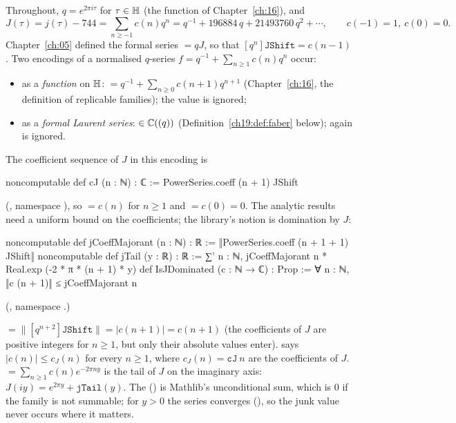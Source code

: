 Throughout, $q=e^{2\pi i\tau}$ for $\tau\in\mathbb{H}$ (the function  of Chapter~\ref{ch:16}), and
\begin{equation*}
  J(\tau)=j(\tau)-744=\sum_{n\ge-1}c(n)q^n=q^{-1}+196884\,q+21493760\,q^2+\cdots,\qquad c(-1)=1,\ c(0)=0 .
\end{equation*}
Chapter~\ref{ch:05} defined the formal series  $=qJ$, so that $[q^n]\mathtt{JShift}=c(n-1)$.  Two
encodings of a normalised $q$-series $f=q^{-1}+\sum_{n\ge1}c(n)q^n$ occur:
\begin{itemize}
\item as a \emph{function} on $\mathbb{H}$:  $=q^{-1}+\sum_{n\ge0}c(n+1)q^{n+1}$
  (Chapter~\ref{ch:16}, the definition of replicable families); the value  is ignored;
\item as a \emph{formal Laurent series}:  $\in{\mathbb{C}}((q))$ (Definition~\ref{ch19:def:faber} below);
  again  is ignored.
\end{itemize}
The coefficient sequence of $J$ in this encoding is
\begin{leancode}
noncomputable def cJ (n : ℕ) : ℂ := PowerSeries.coeff (n + 1) JShift
\end{leancode}
(, namespace ), so
 $=c(n)$ for $n\ge1$ and  $=c(0)=0$.  The analytic results need a uniform bound on the
coefficients; the library's notion is domination by $J$:
\begin{leancode}
noncomputable def jCoeffMajorant (n : ℕ) : ℝ := ‖PowerSeries.coeff (n + 1 + 1) JShift‖
noncomputable def jTail (y : ℝ) : ℝ :=
  ∑' n : ℕ, jCoeffMajorant n * Real.exp (-2 * π * (n + 1) * y)
def IsJDominated (c : ℕ → ℂ) : Prop :=
  ∀ n : ℕ, ‖c (n + 1)‖ ≤ jCoeffMajorant n
\end{leancode}
(, namespace .)
\begin{dictionary}
 $=\|[q^{n+2}]\mathtt{JShift}\|=|c(n+1)|=c(n+1)$ (the coefficients of $J$ are positive integers
for $n\ge1$, but only their absolute values enter).   says $|c(n)|\le c_J(n)$ for every $n\ge1$,
where $c_J(n)=\mathtt{cJ}\ n$ are the coefficients of $J$.  
$=\sum_{n\ge1}c(n)e^{-2\pi ny}$ is the tail of $J$ on the imaginary axis: $J(iy)=e^{2\pi y}+\mathtt{jTail}(y)$.  The
 () is Mathlib's unconditional sum, which is $0$ if the family is not summable; for $y>0$ the
series converges (), so the junk value never occurs where it matters.
\end{dictionary}
